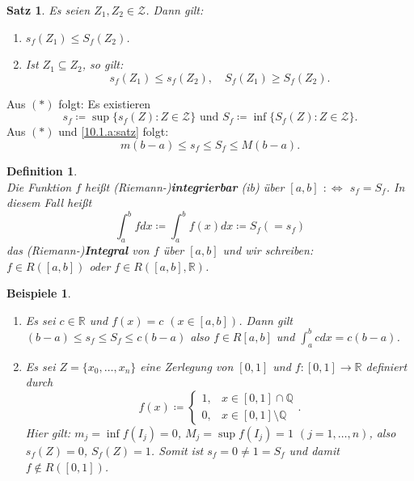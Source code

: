 \documentclass[12pt]{extreport} %
\newcommand{\Q}{\mathbb{Q}}
\newcommand{\R}{\mathbb{R}}
\theoremstyle{named}
\theoremstyle{itshape}
\newtheorem{satz}[unnamedtheorem]{Satz}
\newtheorem*{definition}{Definition}
\theoremstyle{normal}
\newtheorem*{beispiele}{Beispiele}
\begin{document}
{\begin{satz} \label{10.1:satz}
Es seien $Z_{1}, Z_{2} \in \mathcal{Z}$. Dann gilt:
	\begin{enumerate}
		\item $s_{f}(Z_{1}) \leq S_{f}(Z_{2})$. \label{10.1.a:satz}
		\item Ist $Z_{1} \subseteq Z_{2}$, so gilt: 
		      $$s_{f}(Z_{1}) \leq s_{f}(Z_{2}), \quad S_{f}(Z_{1}) \geq S_{f}(Z_{2}). $$ \label{10.1.b:satz}
	\end{enumerate}	      
\end{satz}		      

Aus $(*)$ folgt: Es existieren
	$$ s_{f}  \coloneqq \sup \{ s_{f}(Z) \colon Z \in \mathcal{Z} \} \text{ und } S_{f}  \coloneqq \inf \{ S_{f}(Z) \colon Z \in \mathcal{Z} \}.$$
Aus $(*)$ und \ref{10.1.a:satz} folgt:
	$$ m (b - a) \leq s_{f} \leq  S_{f} \leq M (b - a). $$


   
\begin{definition} ~\\
	Die Funktion $f$ hei{\ss}t (Riemann-)\textbf{integrierbar} (ib) über $[a, b]$ $:\iff$ $s_{f} = S_{f}$. In diesem Fall hei{\ss}t
		$$ \int_{a}^{b} f dx \coloneqq \int_{a}^{b} f(x) dx \coloneqq S_{f} (= s_{f}) $$
	das (Riemann-)\textbf{Integral}	von $f$ über $[a, b]$ und wir schreiben: \\
	$f \in R([a, b])$ oder $f \in R([a, b],\R)$.
\end{definition}


\begin{beispiele} ~\
	\begin{enumerate}
		\item Es sei $c \in \R$ und $f(x) = c$ $(x \in [a, b])$. Dann gilt $(b - a) \leq s_{f} \leq S_{f} \leq c(b- a)$ also $f \in R[a, b]$ und 
		$\int_{a}^{b}c dx = c(b - a)$.
		\item Es sei $Z = \{ x_{0}, \dotsc, x_{n} \}$ eine Zerlegung von $[0, 1]$ und $f:[0,1] \to \R$ definiert durch
			$$ f(x) \coloneqq \begin{cases} 1, & x \in [0, 1] \cap \Q \\ 0, & x \in [0, 1] \setminus \Q \end{cases}. $$  
			Hier gilt: $m_{j} = \inf f(I_{j}) = 0$, $ M_{j} = \sup f(I_{j}) = 1$ $(j=1,\dots,n)$, also $s_{f}(Z) = 0$, $S_{f}(Z) = 1$.
			Somit ist $s_{f} = 0 \neq 1 = S_{f}$ und damit $f \notin R([0, 1])$.
	\end{enumerate}	
\end{beispiele}

}
\end{document}
